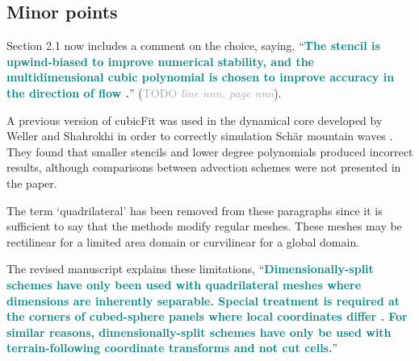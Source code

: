 \documentclass[times]{elsarticle}
\newcommand{\TODO}[1]{\textcolor{darkgray}{TODO \textit{#1}}}
\newcommand{\revtwo}[1]{\textcolor{teal}{\textbf{#1}}}
\begin{document}
\subsection*{Minor points}

\begin{quotation}
\begin{comment}
\item It would be interesting to know if there was some rationale for the choice of
the polynomial (5) and the stencil discussed in  section 2.1.1. Given that the scheme
is second order convergent, might it be possible to use a lower degree polynomial
and smaller stencil?
\end{comment}
\end{quotation}
Section 2.1 now includes a comment on the choice, saying, ``\revtwo{The stencil is upwind-biased to improve numerical stability, and the multidimensional cubic polynomial is chosen to improve accuracy in the direction of flow \citep{leonard1993}.}'' (\TODO{line nnn, page nnn}).

A previous version of cubicFit was used in the dynamical core developed by Weller and Shahrokhi \citep{weller-shahrokhi2014} in order to correctly simulation Sch\"ar mountain waves \citep{schaer2002}.  They found that smaller stencils and lower degree polynomials produced incorrect results, although comparisons between advection schemes were not presented in the paper.

\begin{quotation}
\begin{comment}
\item The first two paragraphs on p2 refer to quadrilateral meshes. It seems the discussion
has slipped into the 2D vertical slice case without explicitly saying so.
\end{comment}
\end{quotation}
The term `quadrilateral' has been removed from these paragraphs since it is sufficient to say that the methods modify regular meshes.  These meshes may be rectilinear for a limited area domain or curvilinear for a global domain.

\begin{quotation}
\begin{comment}
\item P2, 5th paragraph. Perhaps mention that dimensionally-split schemes are only possible
when the grid permits it (e.g.\ not a hexagonal grid).
\end{comment}
\end{quotation}
The revised manuscript explains these limitations, ``\revtwo{Dimensionally-split schemes have only been used with quadrilateral meshes where dimensions are inherently separable.  Special treatment is required at the corners of cubed-sphere panels where local coordinates differ \citep{putman-lin2007,katta2015}.
For similar reasons, dimensionally-split schemes have only be used with terrain-following coordinate transforms and not cut cells.}''
\end{document}
